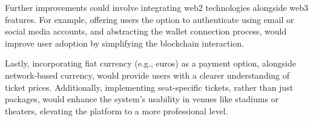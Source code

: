Further improvements could involve integrating web2 technologies alongside web3
features. For example, offering users the option to authenticate using email or
social media accounts, and abstracting the wallet connection process, would
improve user adoption by simplifying the blockchain interaction.

Lastly, incorporating fiat currency (e.g., euros) as a payment option,
alongside network-based currency, would provide users with a clearer
understanding of ticket prices. Additionally, implementing seat-specific
tickets, rather than just packages, would enhance the system's usability in
venues like stadiums or theaters, elevating the platform to a more professional
level.
